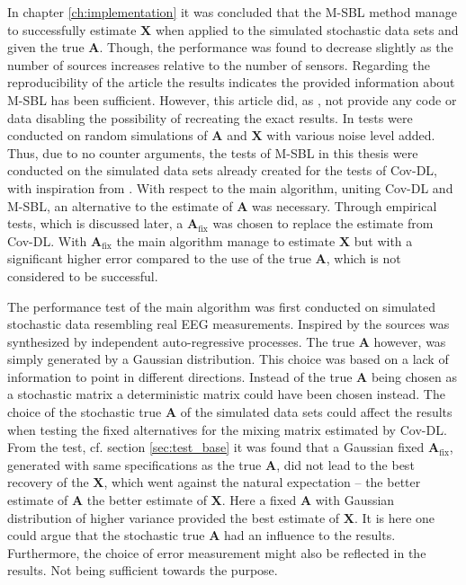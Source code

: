 In chapter \ref{ch:implementation} it was concluded that the M-SBL method manage to successfully estimate $\mathbf{X}$ when applied to the simulated stochastic data sets and given the true $\mathbf{A}$. 
Though, the performance was found to decrease slightly as the number of sources increases relative to the number of sensors. 
Regarding the reproducibility of the article \cite{Balkan2014} the results indicates the provided information about M-SBL has been sufficient.
However, this article did, as \cite{Balkan2015}, not provide any code or data disabling the possibility of recreating the exact results. In \cite{Balkan2014} tests were conducted on random simulations of $\mathbf{A}$ and $\mathbf{X}$ with various noise level added. 
Thus, due to no counter arguments, the tests of M-SBL in this thesis were conducted on the simulated data sets already created for the tests of Cov-DL, with inspiration from \cite{Balkan2014}.
With respect to the main algorithm, uniting Cov-DL and M-SBL, an alternative to the estimate of $\mathbf{A}$ was necessary. 
Through empirical tests, which is discussed later, a $\mathbf{A}_{\text{fix}}$ was chosen to replace the estimate from Cov-DL. 
With $\mathbf{A}_{\text{fix}}$ the main algorithm manage to estimate $\mathbf{X}$ but with a significant higher error compared to the use of the true $\mathbf{A}$, which is not considered to be successful.

The performance test of the main algorithm was first conducted on simulated stochastic data resembling real EEG measurements. 
Inspired by \cite{Balkan2015} the sources was synthesized by independent auto-regressive processes. 
The true $\mathbf{A}$ however, was simply generated by a Gaussian distribution. 
This choice was based on a lack of information to point in different directions. 
Instead of the true $\mathbf{A}$ being chosen as a stochastic matrix a deterministic matrix could have been chosen instead. 
The choice of the stochastic true $\mathbf{A}$ of the simulated data sets could affect the results when testing the fixed alternatives for the mixing matrix estimated by Cov-DL. 
From the test, cf. section \ref{sec:test_base} it was found that a Gaussian fixed $\mathbf{A}_{\text{fix}}$, generated with same specifications as the true $\mathbf{A}$, did not lead to the best recovery of the $\mathbf{X}$, which went against the natural expectation -- the better estimate of $\mathbf{A}$ the better estimate of $\mathbf{X}$. 
Here a fixed $\mathbf{A}$ with Gaussian distribution of higher variance provided the best estimate of $\mathbf{X}$. 
It is here one could argue that the stochastic true $\mathbf{A}$ had an influence to the results. 
Furthermore, the choice of error measurement might also be reflected in the results. Not being sufficient towards the purpose. 

